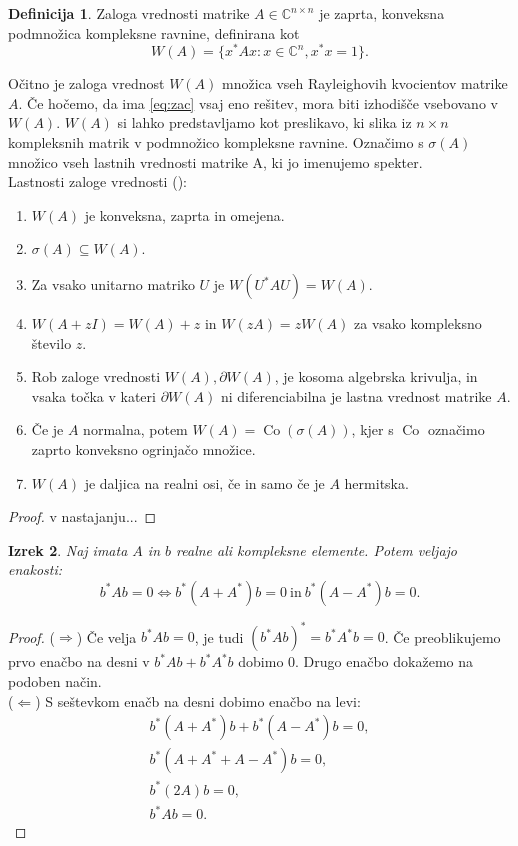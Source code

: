 \documentclass[12pt,a4paper]{amsart}
\theoremstyle{definition}
\newtheorem{definicija}{Definicija}[section]
\theoremstyle{plain}
\newtheorem{izrek}[definicija]{Izrek}
\newcommand{\Co}{\operatorname{Co}} %
\newcommand{\C}{\mathbb C}
\begin{document}
\begin{definicija}
Zaloga vrednosti matrike $A \in \C^{n\times n}$ je zaprta, konveksna podmnožica kompleksne ravnine, definirana kot
$$W(A)=\{x^\ast Ax: x \in \C^n, x^\ast x=1\}.$$
\end{definicija}
Očitno je zaloga vrednost $W(A)$ množica vseh Rayleighovih kvocientov matrike $A$. Če hočemo, da ima \eqref{eq:zac} vsaj eno rešitev, mora biti izhodišče vsebovano v $W(A)$. $W(A)$ si lahko predstavljamo kot preslikavo, ki slika iz $n\times n$ kompleksnih matrik v podmnožico kompleksne ravnine. Označimo s $\sigma(A)$ množico vseh lastnih vrednosti matrike A, ki jo imenujemo spekter.\\ Lastnosti zaloge vrednosti (\cite{num}):
\begin{enumerate}
\item $W(A)$ je konveksna, zaprta in omejena.
\item $\sigma(A)\subseteq W(A).$
\item Za vsako unitarno matriko $U$ je $W(U^\ast AU)=W(A).$
\item $W(A+zI)=W(A)+z$ in $W(zA)=zW(A)$ za vsako kompleksno število $z$.
\item Rob zaloge vrednosti $W(A), \partial W(A)$, je kosoma algebrska krivulja, in vsaka točka v kateri $\partial W(A)$ ni diferenciabilna je lastna vrednost matrike $A$.
\item Če je $A$ normalna, potem $W(A)=\Co(\sigma(A))$, kjer s $\Co$ označimo zaprto konveksno ogrinjačo množice.
\item $W(A)$ je daljica na realni osi, če in samo če je $A$ hermitska.
\end{enumerate}
\begin{proof}
v nastajanju...
\end{proof}
\begin{izrek}
Naj imata $A$ in $b$ realne ali kompleksne elemente. Potem veljajo enakosti:
$$b^\ast Ab=0\Leftrightarrow b^\ast (A+A^\ast)b=0 \ \textrm{in}\  b^\ast(A-A^\ast)b=0.$$
\end{izrek}
\begin{proof}
($\Rightarrow$) Če velja $b^\ast Ab=0$, je tudi $(b^\ast Ab)^\ast=b^\ast A^\ast b=0$. Če preoblikujemo prvo enačbo na desni v $b^\ast Ab +b^\ast A^\ast b$ dobimo 0. Drugo enačbo dokažemo na podoben način.\\
($\Leftarrow$) S seštevkom enačb na desni dobimo enačbo na levi:
\begin{align*}
 b^\ast (A+A^\ast)b+b^\ast(A-A^\ast)b=0,\\
b^\ast (A+A^\ast+A-A^\ast)b=0,\\
b^\ast (2A)b=0,\\
b^\ast Ab=0.
\end{align*}
\end{proof}
\end{document}
